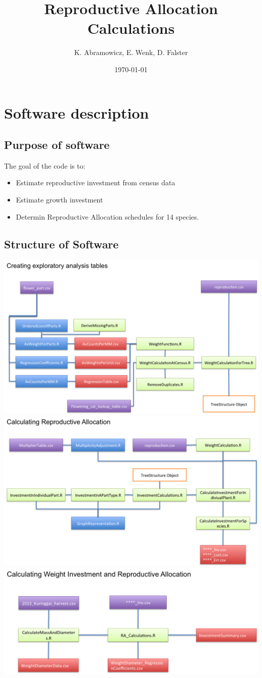 \documentclass[10pt]{book} %
\title{Reproductive Allocation Calculations}
\author{K. Abramowicz, E. Wenk, D. Falster}
\date{\today}
\begin{document}
\maketitle
\chapter{Software description}
\section{Purpose of software}
The goal of the code is to:
\begin{itemize}
\item Estimate reproductive investment from census data
\item Estimate growth investment
\item Determin Reproductive Allocation schedules for 14 species.
\end{itemize}
\section{Structure of Software}
\begin{center}
\includegraphics[width=0.75\linewidth]{images/Flow1.png}\\
\includegraphics[width=0.75\linewidth]{images/Flow2.png}\\
\includegraphics[width=0.75\linewidth]{images/Flow3.png}
\end{center}
\end{document}
